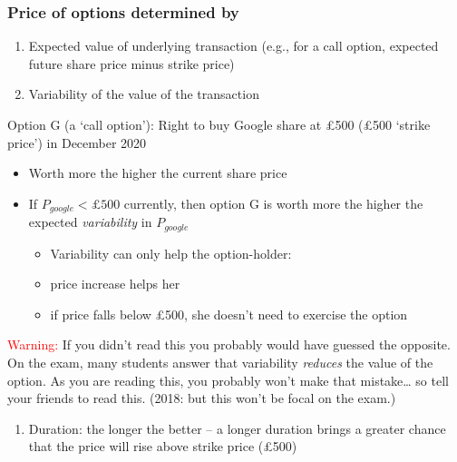 \documentclass[]{article}
\providecommand{\tightlist}{%
  \setlength{\itemsep}{0pt}\setlength{\parskip}{0pt}}
\begin{document}
\hypertarget{price-of-options-determined-by}{%
\subsubsection{Price of options determined by}\label{price-of-options-determined-by}}

\begin{enumerate}
\def\labelenumi{\arabic{enumi}.}
\item
  Expected value of underlying transaction (e.g., for a call option, expected future share price minus strike price)
\item
  Variability of the value of the transaction
\end{enumerate}

Option G (a `call option'): Right to buy Google share at £500 (£500 `strike price') in December 2020

\begin{itemize}
\item
  Worth more the higher the current share price
\item
  If \(P_{google}<\pounds 500\) currently, then option G is worth more the higher the expected \emph{variability} in \(P_{google}\)

  \begin{itemize}
  \tightlist
  \item
    Variability can only help the option-holder:
  \item
    price increase helps her
  \item
    if price falls below \pounds 500, she doesn't need to exercise the option
  \end{itemize}
\end{itemize}

\textcolor{red}{Warning:} If you didn't read this you probably would have guessed the opposite. On the exam, many students answer that variability \emph{reduces} the value of the option. As you are reading this, you probably won't make that mistake\ldots{} so tell your friends to read this. (2018: but this won't be focal on the exam.)

\bigskip

\begin{enumerate}
\def\labelenumi{\arabic{enumi}.}
\setcounter{enumi}{2}
\tightlist
\item
  Duration: the longer the better -- a longer duration brings a greater chance that the price will rise above strike price (£500)
\end{enumerate}
\end{document}
